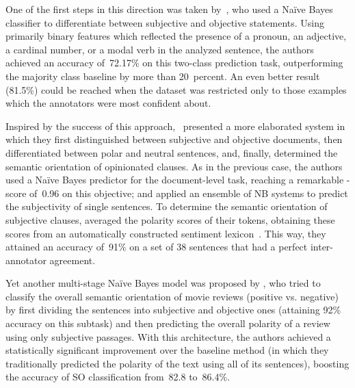 One of the first steps in this direction was taken
by~\citet{Wiebe:99}, who used a Na{\"i}ve Bayes classifier to
differentiate between subjective and objective statements.  Using
primarily binary features which reflected the presence of a pronoun,
an adjective, a cardinal number, or a modal verb in the analyzed
sentence, the authors achieved an accuracy of~72.17\% on this
two-class prediction task, outperforming the majority class baseline
by more than 20~percent.  An even better result (81.5\%) could be
reached when the dataset was restricted only to those examples which
the annotators were most confident about.

Inspired by the success of this approach,~\citet{Yu:03} presented a
more elaborated system in which they first distinguished between
subjective and objective documents, then differentiated between polar
and neutral sentences, and, finally, determined the semantic
orientation of opinionated clauses.  As in the previous case, the
authors used a Na{\"i}ve Bayes predictor for the document-level task,
reaching a remarkable \F-score of~0.96 on this objective; and applied
an ensemble of NB systems to predict the subjectivity of single
sentences.  To determine the semantic orientation of subjective
clauses, \citeauthor{Yu:03} averaged the polarity scores of their
tokens, obtaining these scores from an automatically constructed
sentiment lexicon~\cite{Hatzivassi:97}.  This way, they attained an
accuracy of~91\% on a set of 38 sentences that had a perfect
inter-annotator agreement.

Yet another multi-stage Na{\"i}ve Bayes model was proposed by
\citet{Pang:04}, who tried to classify the overall semantic
orientation of movie reviews (positive vs. negative) by first dividing
the sentences into subjective and objective ones (attaining 92\%
accuracy on this subtask) and then predicting the overall polarity of
a review using only subjective passages.  With this architecture, the
authors achieved a statistically significant improvement over the
baseline method (in which they traditionally predicted the polarity of
the text using all of its sentences), boosting the accuracy of SO
classification from~82.8 to~86.4\%.

